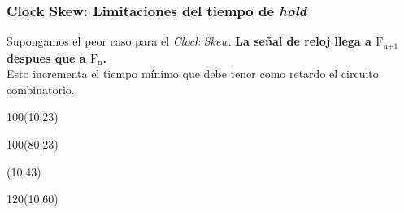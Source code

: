 \documentclass[aspectratio=169]{beamer}
\begin{document}
\begin{frame}[fragile,t]
    \frametitle{Clock Skew: Limitaciones del tiempo de \emph{hold}}
    Supongamos el peor caso para el \emph{Clock Skew}. \textbf{La señal de reloj llega a $\text{F}_{\text{n+1}}$ despues que a $\text{F}_{\text{n}}$.}\\
    \textcolor{verdeuca}{Esto incrementa el tiempo mínimo que debe tener como retardo el circuito combinatorio.}
    \begin{textblock}{100}(10,23)
    \end{textblock}
    \begin{textblock}{100}(80,23)
    \end{textblock}
    \begin{textblock}{60}(10,43)
    \end{textblock}
    \begin{textblock}{120}(10,60)
    \bigskip
    \end{textblock}
\end{frame}
\end{document}
